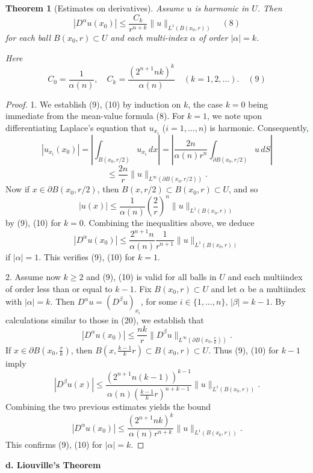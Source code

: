 \documentclass[a4paper,12pt]{report}
\newtheorem{theorem}{Theorem}[section]
\begin{document}
\begin{theorem}[Estimates on derivatives]
Assume \( u \) is harmonic in \( U \). Then
\[
|D^\alpha u(x_0)| \leq \frac{C_k}{r^{n+k}} \|u\|_{L^1(B(x_0, r))} \quad (8)
\]
for each ball \( B(x_0, r) \subset U \) and each multi-index \( \alpha \) of order \( |\alpha| = k \).

Here
\[
C_0 = \frac{1}{\alpha(n)}, \quad C_k = \frac{(2^{n+1}nk)^k}{\alpha(n)} \quad (k = 1, 2, \dots). \quad (9)
\]
\end{theorem}
\begin{proof}
1. We establish (9), (10) by induction on \( k \), the case \( k = 0 \) being immediate from the mean-value formula (8). For \( k = 1 \), we note upon differentiating Laplace’s equation that \( u_{x_i} \) (\( i = 1, \dots, n \)) is harmonic. Consequently,
\[
|u_{x_i}(x_0)| = \left| \int_{B(x_0, r/2)} u_{x_i} \, dx \right|
= \left| \frac{2n}{\alpha(n) r^n} \int_{\partial B(x_0, r/2)} u \, dS \right|
\]
\[
\leq \frac{2n}{r} \|u\|_{L^\infty(\partial B(x_0, r/2))}.
\]
Now if \( x \in \partial B(x_0, r/2) \), then \( B(x, r/2) \subset B(x_0, r) \subset U \), and so
\[
|u(x)| \leq \frac{1}{\alpha(n)} \left( \frac{2}{r} \right)^n \|u\|_{L^1(B(x_0, r))}
\]
by (9), (10) for \( k = 0 \). Combining the inequalities above, we deduce
\[
|D^\alpha u(x_0)| \leq \frac{2^{n+1} n}{\alpha(n)} \frac{1}{r^{n+1}} \|u\|_{L^1(B(x_0, r))}
\]
if \( |\alpha| = 1 \). This verifies (9), (10) for \( k = 1 \).

2. Assume now \( k \geq 2 \) and (9), (10) is valid for all balls in \( U \) and each multiindex of order less than or equal to \( k - 1 \). Fix \( B(x_0, r) \subset U \) and let \( \alpha \) be a multiindex with $|\alpha| = k$. Then $D^\alpha u = (D^\beta u)_{x_i}$, for some $i \in \{1, \dots, n\}$, $|\beta| = k - 1$. By calculations similar to those in (20), we establish that
\[
|D^\alpha u(x_0)| \leq \frac{nk}{r} \|D^\beta u\|_{L^\infty(\partial B(x_0, \frac{r}{k}))}.
\]
If $x \in \partial B(x_0, \frac{r}{k})$, then $B(x, \frac{k-1}{k}r) \subset B(x_0, r) \subset U$. Thus (9), (10) for $k - 1$ imply
\[
|D^\beta u(x)| \leq \frac{(2^{n+1} n(k-1))^{k-1}}{\alpha(n) \left( \frac{k-1}{k} r \right)^{n+k-1}} \|u\|_{L^1(B(x_0, r))}.
\]
Combining the two previous estimates yields the bound
\[
|D^\alpha u(x_0)| \leq \frac{(2^{n+1} nk)^k}{\alpha(n) r^{n+k}} \|u\|_{L^1(B(x_0, r))}.
\]
This confirms (9), (10) for \(|\alpha| = k\). 
\end{proof}
\noindent
\textbf{d. Liouville's Theorem}\\
\end{document}

